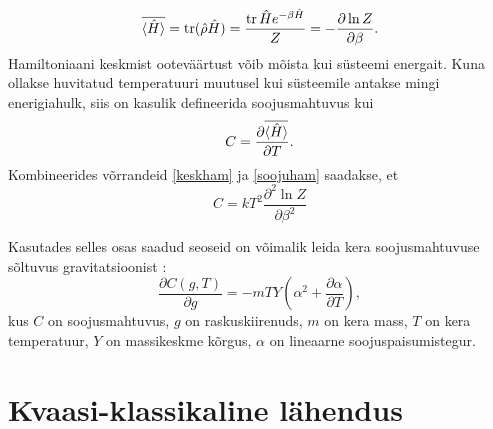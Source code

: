 \documentclass{trkut}%
\DeclareMathOperator{\tr}{tr}
\renewcommand\braket[1]{\langle{#1}\rangle}
\begin{document}
\begin{equation}
    \overline{\braket{\op{H}}}=\tr(\op{\rho}\op{H})=\frac{\tr{\op{H}e^{-\beta \op{H}}}}{Z}= -\frac{\partial \ln Z}{\partial \beta}.
    \label{keskham}
\end{equation}
Hamiltoniaani keskmist ooteväärtust võib mõista kui süsteemi energait. Kuna ollakse huvitatud temperatuuri muutusel kui süsteemile antakse mingi enerigiahulk, siis on kasulik defineerida soojusmahtuvus kui
\begin{equation}
    C = \frac{\partial \overline{\braket{\op{H}}}}{\partial T}.
    \label{soojuham}
\end{equation}
Kombineerides võrrandeid \eqref{keskham} ja \eqref{soojuham} saadakse, et
\begin{equation}
    C = k T^2 \frac{\partial^2 \ln Z}{\partial \beta^2}
    \label{mahtuvus}
\end{equation}

Kasutades selles osas saadud seoseid on võimalik leida kera soojusmahtuvuse sõltuvus gravitatsioonist \parencite[10-13]{palma15}:
\begin{equation} \label{palmasor}
    \frac{\partial C(g,T)}{\partial g} = -mTY \left( \alpha^2 + \frac{\partial \alpha}{\partial T} \right),
\end{equation}
kus \(C\) on soojusmahtuvus, \(g\) on raskuskiirenuds, \(m\) on kera mass, \(T\) on kera temperatuur, \(Y\) on massikeskme kõrgus, \(\alpha\) on lineaarne soojuspaisumistegur.


\section{Kvaasi-klassikaline lähendus}
\end{document}
